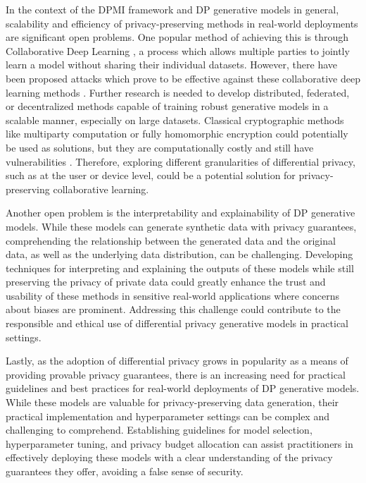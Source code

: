 \documentclass{article}
\begin{document}
In the context of the DPMI framework and DP generative models in general, scalability and efficiency of privacy-preserving methods in real-world deployments are significant open problems. One popular method of achieving this is through Collaborative Deep Learning \cite{collab}, a process which allows multiple parties to jointly learn a model without sharing their individual datasets. However, there have been proposed attacks which prove to be effective against these collaborative deep learning methods \cite{collab_attack}. Further research is needed to develop distributed, federated, or decentralized methods capable of training robust generative models in a scalable manner, especially on large datasets. Classical cryptographic methods like multiparty computation or fully homomorphic encryption could potentially be used as solutions, but they are computationally costly and still have vulnerabilities \cite{collab_attack}. Therefore, exploring different granularities of differential privacy, such as at the user or device level, could be a potential solution for privacy-preserving collaborative learning. 

Another open problem is the interpretability and explainability of DP generative models. While these models can generate synthetic data with privacy guarantees, comprehending the relationship between the generated data and the original data, as well as the underlying data distribution, can be challenging. Developing techniques for interpreting and explaining the outputs of these models while still preserving the privacy of private data could greatly enhance the trust and usability of these methods in sensitive real-world applications where concerns about biases are prominent. Addressing this challenge could contribute to the responsible and ethical use of differential privacy generative models in practical settings.

Lastly, as the adoption of differential privacy grows in popularity as a means of providing provable privacy guarantees, there is an increasing need for practical guidelines and best practices for real-world deployments of DP generative models. While these models are valuable for privacy-preserving data generation, their practical implementation and hyperparameter settings can be complex and challenging to comprehend. Establishing guidelines for model selection, hyperparameter tuning, and privacy budget allocation can assist practitioners in effectively deploying these models with a clear understanding of the privacy guarantees they offer, avoiding a false sense of security.
\end{document}
